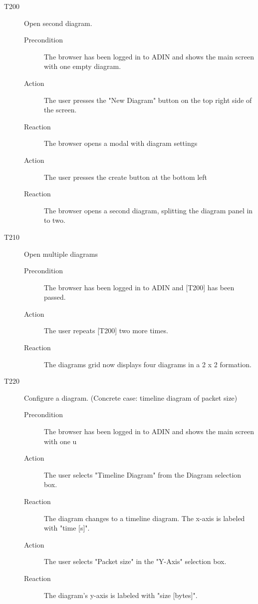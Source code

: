 \documentclass[twoside, english, draft]{Pflichtenheft}
\begin{document}
\begin{description}
	\item[T200] Open second diagram.
	      \begin{description}
		      \item[Precondition]
		            The browser has been logged in to ADIN and shows the main screen with one empty diagram.
		      \item[Action]
		            The user presses the "New Diagram" button on the top right side of the screen.
		      \item[Reaction]
		            The browser opens a modal with diagram settings
		      \item[Action]
		            The user presses the create button at the bottom left
		      \item[Reaction]
		            The browser opens a second diagram, splitting the diagram panel in to two.
 \end{description}
	


	\item[T210] Open multiple diagrams
	      \begin{description}
		      \item[Precondition]
		            The browser has been logged in to ADIN and [T200] has been passed.
		      \item[Action]
		            The user repeats [T200] two more times.
		      \item[Reaction]
		            The diagrams grid now displays four diagrams in a 2 x 2 formation.
 \end{description}

	\item[T220] Configure a diagram. (Concrete case: timeline diagram of packet size)
	      \begin{description}
		      \item[Precondition]
			    The browser has been logged in to ADIN and shows the main screen with one u
		      \item[Action]
			    The user selects "Timeline Diagram" from the Diagram selection box.
		      \item[Reaction]
		            The diagram changes to a timeline diagram. The x-axis is labeled with "time [s]".
		      \item[Action]
		            The user selects "Packet size" in the "Y-Axis" selection box.
		      \item[Reaction]
		            The diagram's y-axis is labeled with "size [bytes]".
	      \end{description}


\end{description}
\end{document}
